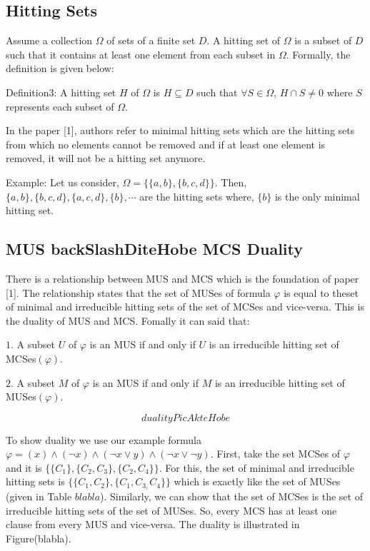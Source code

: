 \subsection{Hitting Sets}
Assume a collection $\Omega$ of sets of a finite set $D$. A hitting set of $\Omega$ is a subset of $D$ such that it contains at least one element from each subset in $\Omega$. Formally, the definition is given below:

Definition3: A hitting set $H$ of $\Omega$ is $H\subseteq D$ such that $\forall S\in \Omega$, $H\cap S\neq 0$ where $S$ represents each subset of $\Omega$.

In the paper [1], authors refer to minimal hitting sets which are the hitting sets from which no elements cannot be removed and if at least one element is removed, it will not be a hitting set anymore.

Example: Let us consider, $\Omega=\{\{a, b\}, \{b, c, d\}\}$. Then, $\{a,b\}, \{b,c,d\}, \{a,c,d\}, \{b\},\cdots$ are the hitting sets where, $\{b\}$ is the only minimal hitting set.
\subsection{MUS backSlashDiteHobe MCS Duality}
There is a relationship between MUS and MCS which is the foundation of paper [1]. The relationship states that the set of MUSes of formula $\varphi$ is equal to theset of minimal and irreducible hitting sets of the set of MCSes and vice-versa. This is the duality of MUS and MCS. Fomally it can said that:

$1.$ A subset $U$ of $\varphi$ is an MUS if and only if $U$ is an irreducible hitting set of MCSes$(\varphi)$.

$2.$ A subset $M$ of $\varphi$ is an MUS if and only if $M$ is an irreducible hitting set of MUSes$(\varphi)$.

$$dualityPicAkteHobe$$

To show duality we use our example formula $\varphi=(x)\wedge(\neg x)\wedge(\neg x\vee y)\wedge(\neg x \vee \neg y)$. First, take the set MCSes of $\varphi$ and it is $\{\{C_{1}\}, \{C_{2}, C_{3}\}, \{C_{2}, C_{4}\}\}$. For this, the set of minimal and irreducible hitting sets is $\{\{C_{1}, C_{2}\}, \{C_{1}, C_{3,} C_{4}\}\}$ which is exactly like the set of MUSes (given in Table $blabla$). Similarly, we can show that the set of MCSes is the set of irreducible hitting sets of the set of MUSes. So, every MCS has at least one clause from every MUS and vice-versa. The duality is illustrated in Figure(blabla).

